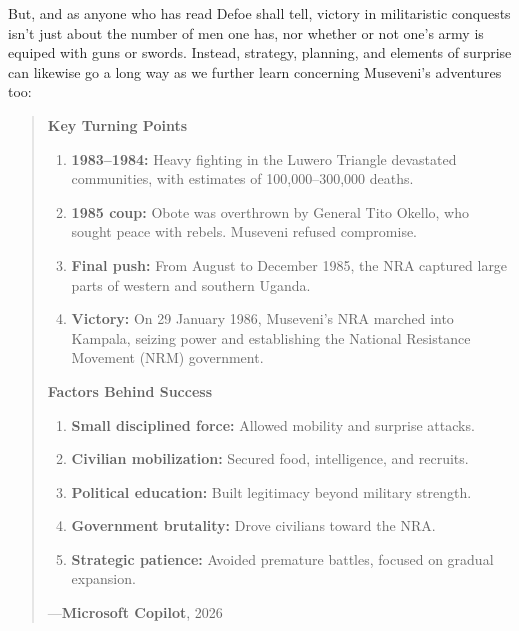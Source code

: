 \documentclass[a4paper]{article}
\begin{document}
But, and as anyone who has read Defoe shall tell, victory in militaristic conquests isn't just about the number of men one has, nor whether or not one's army is equiped with guns or swords. Instead, strategy, planning, and elements of surprise can likewise go a long way as we further learn concerning Museveni's adventures too:

\noindent
\begin{minipage}{1\textwidth}
\vspace{1em}
\begin{quotation}
{\ttfamily


\textbf{Key Turning Points}
\begin{enumerate}
  \item \textbf{1983--1984:} Heavy fighting in the Luwero Triangle devastated communities, with estimates of 100,000--300,000 deaths.
  \item \textbf{1985 coup:} Obote was overthrown by General Tito Okello, who sought peace with rebels. Museveni refused compromise.
  \item \textbf{Final push:} From August to December 1985, the NRA captured large parts of western and southern Uganda.
  \item \textbf{Victory:} On 29 January 1986, Museveni’s NRA marched into Kampala, seizing power and establishing the National Resistance Movement (NRM) government.
\end{enumerate}

\textbf{Factors Behind Success}
\begin{enumerate}
  \item \textbf{Small disciplined force:} Allowed mobility and surprise attacks.
  \item \textbf{Civilian mobilization:} Secured food, intelligence, and recruits.
  \item \textbf{Political education:} Built legitimacy beyond military strength.
  \item \textbf{Government brutality:} Drove civilians toward the NRA.
  \item \textbf{Strategic patience:} Avoided premature battles, focused on gradual expansion.
\end{enumerate}

}
\hspace*{\fill} ---\textbf{Microsoft Copilot}, 2026\cite{copilot_assistant}
\end{quotation}
\vspace{1em}
\end{minipage}
\end{document}
